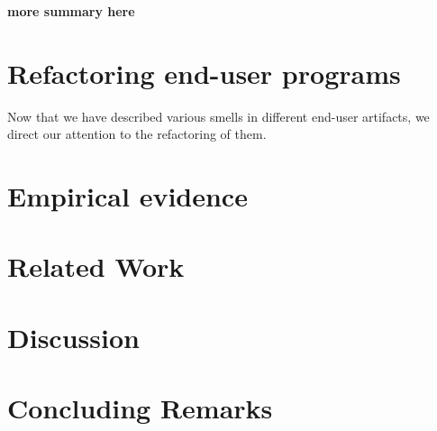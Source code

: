 \documentclass[10pt,conference,compsocconf]{IEEEtran}
\newcommand{\todo}[1]{\textbf{#1}}
\begin{document}
\todo{more summary here}

\section{Refactoring end-user programs}
\label{sec:refactoring}
Now that we have described various smells in different end-user artifacts, we direct our attention to the refactoring of them. 

\section{Empirical evidence}
\label{sec:empirical}


\section{Related Work}
\label{sec:related_work}

\section{Discussion}
\label{sec:discussion}


\section{Concluding Remarks}
\label{sec:conclusions}



\newpage
\balance


\end{document}
